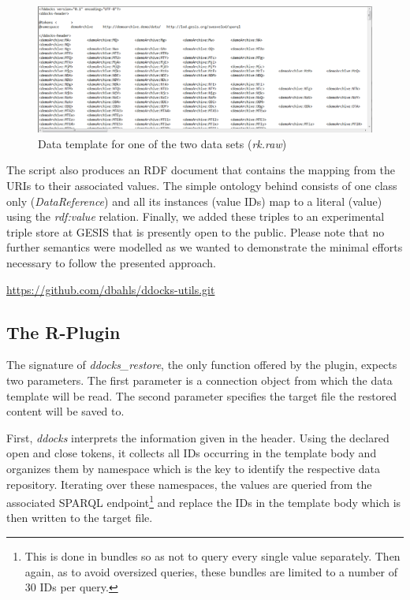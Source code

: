 \documentclass{acm_proc_article-sp}
\begin{document}
\begin{figure}[htb]
\centering
\includegraphics[width=.95\textwidth]{img/datatemplate.png}
\caption{
Data template for one of the two data sets (\textit{rk.raw})
}
\label{fig:datatemplate}
\end{figure}


The script also produces an RDF document that contains the mapping from the URIs to their associated values.
The simple ontology behind consists of one class only (\textit{DataReference}) and all its instances (value IDs) map to a literal (value) using the \textit{rdf:value} relation.
Finally, we added these triples to an experimental triple store at GESIS that is presently open to the public.
Please note that no further semantics were modelled as we wanted to demonstrate the minimal efforts necessary to follow the presented approach.

%
%
\url{https://github.com/dbahls/ddocks-utils.git}



\subsection{The R-Plugin}


The signature of \textit{ddocks\_restore}, the only function offered by the plugin, expects two parameters.
The first parameter is a connection object from which the data template will be read.
The second parameter specifies the target file the restored content will be saved to.

First, \textit{ddocks} interprets the information given in the header.
Using the declared open and close tokens, it collects all IDs occurring in the template body and organizes them by namespace which is the key to identify the respective data repository.
Iterating over these namespaces, the values are queried from the associated SPARQL endpoint\footnote{This is done in bundles so as not to query every single value separately. Then again, as to avoid oversized queries, these bundles are limited to a number of 30 IDs per query.}
and replace the IDs in the template body which is then written to the target file.
\end{document}
